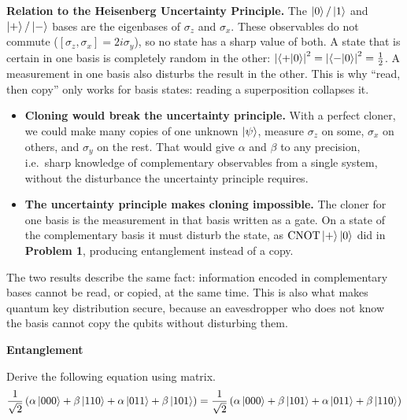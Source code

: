 \documentclass[a4paper, 10pt]{article}
\begin{document}
\begin{solution}
	\noindent \textbf{Relation to the Heisenberg Uncertainty Principle.} The \( \ket{0}/\ket{1} \) and \( \ket{+}/\ket{-} \) bases are the eigenbases of \( \sigma_z \) and \( \sigma_x \). These observables do not commute (\( [\sigma_z, \sigma_x] = 2i\sigma_y \)), so no state has a sharp value of both.
	A state that is certain in one basis is completely random in the other: \( \left|\braket{+ \vert 0}\right|^2 = \left|\braket{- \vert 0}\right|^2 = \tfrac{1}{2} \).
	A measurement in one basis also disturbs the result in the other. This is why ``read, then copy'' only works for basis states: reading a superposition collapses it.
	\begin{itemize}
		\item \textbf{Cloning would break the uncertainty principle.} With a perfect cloner, we could make many copies of one unknown \( \ket{\psi} \), measure \( \sigma_z \) on some, \( \sigma_x \) on others, and \( \sigma_y \) on the rest. That would give \( \alpha \) and \( \beta \) to any precision, i.e.\ sharp knowledge of complementary observables from a single system, without the disturbance the uncertainty principle requires.
		\item \textbf{The uncertainty principle makes cloning impossible.} The cloner for one basis is the measurement in that basis written as a gate. On a state of the complementary basis it must disturb the state, as \( \mathrm{CNOT}\ket{+}\ket{0} \) did in \textbf{Problem 1}, producing entanglement instead of a copy.
	\end{itemize}
	The two results describe the same fact: information encoded in complementary bases cannot be read, or copied, at the same time. This is also what makes quantum key distribution secure, because an eavesdropper who does not know the basis cannot copy the qubits without disturbing them.
\end{solution}

\begin{problem}
\textbf{Entanglement}
\par Derive the following equation using matrix.
\[
	\frac{1}{\sqrt{2}} \left(\alpha\ket{000} + \beta\ket{110} + \alpha\ket{011} + \beta\ket{101}\right)
	= \frac{1}{\sqrt{2}} \left(\alpha\ket{000} + \beta\ket{101} + \alpha\ket{011} + \beta\ket{110}\right)
\]
\end{problem}
\end{document}

